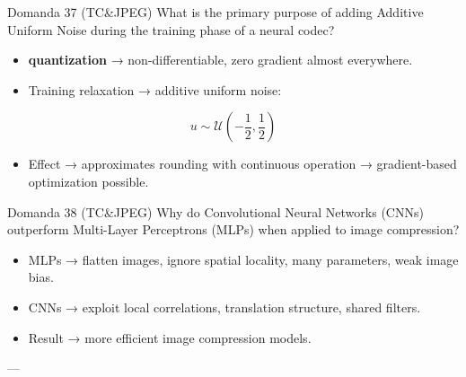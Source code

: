 \begin{questionbox}{Domanda 37}
(TC\&JPEG) What is the primary purpose of adding Additive Uniform Noise during the training phase of a neural codec?
\end{questionbox}


\begin{itemize}
  \item \textbf{quantization} → non-differentiable, zero gradient almost everywhere.
  \item Training relaxation → additive uniform noise:
\end{itemize}


$$
u \sim \mathcal{U}\left(-\frac{1}{2},\frac{1}{2}\right)
$$


\begin{itemize}
  \item Effect → approximates rounding with continuous operation → gradient-based optimization possible.
\end{itemize}



\begin{questionbox}{Domanda 38}
(TC\&JPEG) Why do Convolutional Neural Networks (CNNs) outperform Multi-Layer Perceptrons (MLPs) when applied to image compression?
\end{questionbox}


\begin{itemize}
  \item MLPs → flatten images, ignore spatial locality, many parameters, weak image bias.
  \item CNNs → exploit local correlations, translation structure, shared filters.
  \item Result → more efficient image compression models.
\end{itemize}

---


